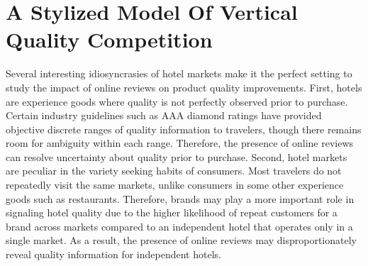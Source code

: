 \documentclass[12pt, leqno]{article}
\begin{document}
\section*{A Stylized Model Of Vertical Quality Competition} \label{sec:theory}

Several interesting idiosyncrasies of hotel markets make it the perfect setting to study the impact of online reviews on product quality improvements. First, hotels are experience goods where quality is not perfectly observed prior to purchase. Certain industry guidelines such as AAA diamond ratings have provided objective discrete ranges of quality information to travelers, though there remains room for ambiguity within each range. Therefore, the presence of online reviews can resolve uncertainty about quality prior to purchase. Second, hotel markets are peculiar in the variety seeking habits of consumers. Most travelers do not repeatedly visit the same markets, unlike consumers in some other experience goods such as restaurants. Therefore, brands may play a more important role in signaling hotel quality due to the higher likelihood of repeat customers for a brand across markets compared to an independent hotel that operates only in a single market. As a result, the presence of online reviews may disproportionately reveal quality information for independent hotels.
\end{document}
